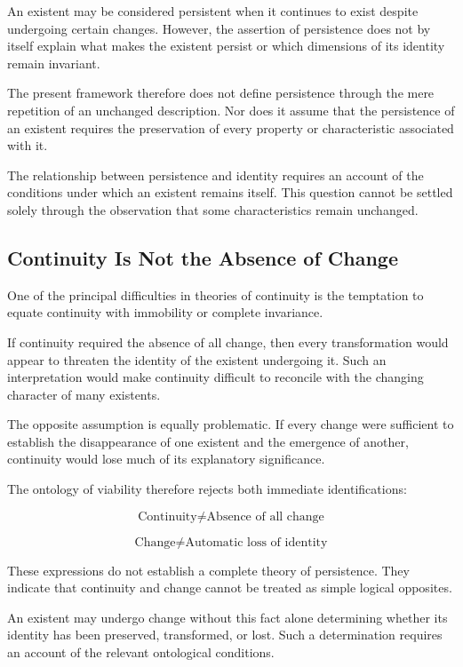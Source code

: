 An existent may be considered persistent when it continues to exist despite undergoing certain changes. However, the assertion of persistence does not by itself explain what makes the existent persist or which dimensions of its identity remain invariant.

The present framework therefore does not define persistence through the mere repetition of an unchanged description. Nor does it assume that the persistence of an existent requires the preservation of every property or characteristic associated with it.

The relationship between persistence and identity requires an account of the conditions under which an existent remains itself. This question cannot be settled solely through the observation that some characteristics remain unchanged.

\subsection{Continuity Is Not the Absence of Change}

One of the principal difficulties in theories of continuity is the temptation to equate continuity with immobility or complete invariance.

If continuity required the absence of all change, then every transformation would appear to threaten the identity of the existent undergoing it. Such an interpretation would make continuity difficult to reconcile with the changing character of many existents.

The opposite assumption is equally problematic. If every change were sufficient to establish the disappearance of one existent and the emergence of another, continuity would lose much of its explanatory significance.

The ontology of viability therefore rejects both immediate identifications:

\[
\text{Continuity} \neq \text{Absence of all change}
\]

\[
\text{Change} \neq \text{Automatic loss of identity}
\]

These expressions do not establish a complete theory of persistence. They indicate that continuity and change cannot be treated as simple logical opposites.

An existent may undergo change without this fact alone determining whether its identity has been preserved, transformed, or lost. Such a determination requires an account of the relevant ontological conditions.

